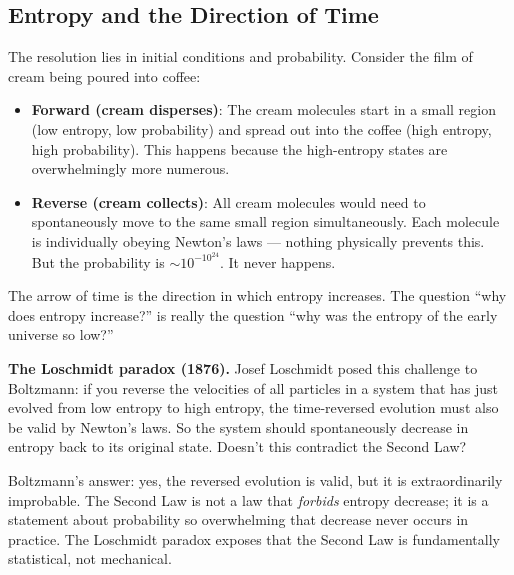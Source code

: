 \documentclass[12pt, a4paper, twoside]{book}
\begin{document}
\subsection{Entropy and the Direction of Time}

The resolution lies in initial conditions and probability. Consider the film of cream being poured into coffee:

\begin{itemize}[leftmargin=2em,itemsep=3pt]
  \item \textbf{Forward (cream disperses)}: The cream molecules start in a small region (low entropy, low probability) and spread out into the coffee (high entropy, high probability). This happens because the high-entropy states are overwhelmingly more numerous.
  \item \textbf{Reverse (cream collects)}: All cream molecules would need to spontaneously move to the same small region simultaneously. Each molecule is individually obeying Newton's laws --- nothing physically prevents this. But the probability is $\sim10^{-10^{24}}$. It never happens.
\end{itemize}

The arrow of time is the direction in which entropy increases. The question ``why does entropy increase?'' is really the question ``why was the entropy of the early universe so low?''

\begin{historybox}
\textbf{The Loschmidt paradox (1876).} Josef Loschmidt posed this challenge to Boltzmann: if you reverse the velocities of all particles in a system that has just evolved from low entropy to high entropy, the time-reversed evolution must also be valid by Newton's laws. So the system should spontaneously decrease in entropy back to its original state. Doesn't this contradict the Second Law?

Boltzmann's answer: yes, the reversed evolution is valid, but it is extraordinarily improbable. The Second Law is not a law that \textit{forbids} entropy decrease; it is a statement about probability so overwhelming that decrease never occurs in practice. The Loschmidt paradox exposes that the Second Law is fundamentally statistical, not mechanical.
\end{historybox}
\end{document}
